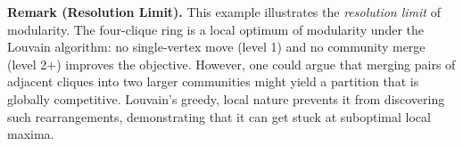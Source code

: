 \documentclass{article}
\begin{document}
\begin{tcolorbox}[colback=white, colframe=black!70, title=\textbf{Solution to Exercise 1}, breakable]
\begin{enumerate}[(a)]
\medskip
\textbf{Remark (Resolution Limit).} This example illustrates the \emph{resolution limit} of modularity. The four-clique ring is a local optimum of modularity under the Louvain algorithm: no single-vertex move (level 1) and no community merge (level 2+) improves the objective. However, one could argue that merging pairs of adjacent cliques into two larger communities might yield a partition that is globally competitive. Louvain's greedy, local nature prevents it from discovering such rearrangements, demonstrating that it can get stuck at suboptimal local maxima.

\end{enumerate}
\end{tcolorbox}

\vspace{12pt}
\end{document}
